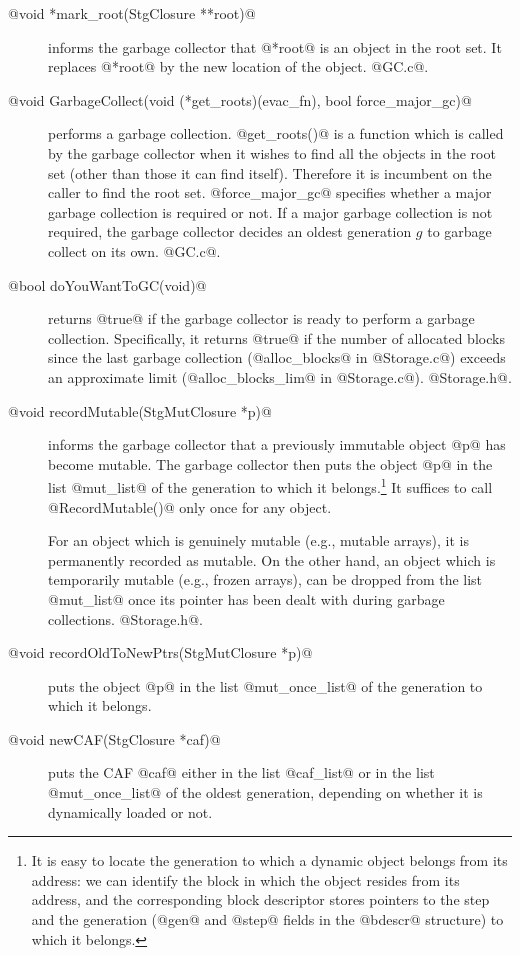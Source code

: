 \documentclass{article}
\begin{document}
\begin{description}
\item[@void *mark\_root(StgClosure **root)@] informs the garbage collector
that @*root@ is an object in the root set. It replaces @*root@ by 
the new location of the object. @GC.c@.
\item[@void GarbageCollect(void (*get\_roots)(evac\_fn), bool force\_major\_gc)@]
performs a garbage collection. 
@get_roots()@ is a function which is called by the garbage collector when
it wishes to find all the objects in the root set (other than those
it can find itself).
Therefore it is incumbent on the caller to find the root set.
@force_major_gc@ specifies whether a major garbage collection is required
or not. If a major garbage collection is not required, the garbage collector
decides an oldest generation $g$ to garbage collect on its own.
@GC.c@.
\item[@bool doYouWantToGC(void)@] returns @true@ if the garbage
collector is ready to perform a garbage collection. Specifically, it returns
@true@ if the number of allocated blocks since the last garbage collection
(@alloc_blocks@ in @Storage.c@) exceeds an approximate limit 
(@alloc_blocks_lim@ in @Storage.c@).
@Storage.h@.
\item[@void recordMutable(StgMutClosure *p)@] informs the garbage collector
that a previously immutable object @p@ has become mutable.
The garbage collector then puts the object @p@ in the list @mut_list@ of the 
generation to which it belongs.\footnote{It is easy to 
locate the generation to which a dynamic object belongs from its address: 
we can identify the block in which the object resides from its address,
and the corresponding block descriptor stores pointers 
to the step and the generation (@gen@ and @step@ fields in the @bdescr@ 
structure) to which it belongs.}
It suffices to call @RecordMutable()@ only once for any object. 

For an object which is genuinely mutable (e.g., mutable arrays), 
it is permanently recorded as mutable. 
On the other hand, 
an object which is temporarily mutable (e.g., frozen arrays),
can be dropped from the list @mut_list@ once its pointer has been dealt with
during garbage collections. @Storage.h@.
\item[@void recordOldToNewPtrs(StgMutClosure *p)@] puts the object @p@ in the
list @mut_once_list@ of the generation to which it belongs.
\item[@void newCAF(StgClosure *caf)@] puts the CAF @caf@ either 
in the list @caf_list@ or
in the list @mut_once_list@ of the oldest generation,
depending on whether it is dynamically loaded or not.
\end{description}
\end{document}
